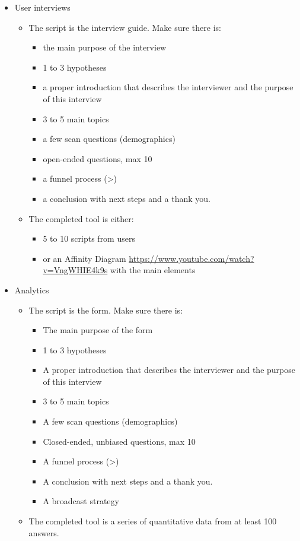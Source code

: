 \begin{itemize}
\item User interviews
\begin{itemize}
\item The script is the interview guide. Make sure there is:
\begin{itemize}
\item the main purpose of the interview
\item 1 to 3 hypotheses
\item a proper introduction that describes the interviewer and the purpose of this interview
\item 3 to 5 main topics
\item a few scan questions (demographics)
\item open-ended questions, max 10
\item a funnel process (>)
\item a conclusion with next steps and a thank you.
\end{itemize}
\item The completed tool is either:
\begin{itemize}
\item 5 to 10 scripts from users
\item or an Affinity Diagram \url{https://www.youtube.com/watch?v=VngWHIE4k9s} with the main elements
\end{itemize}
\end{itemize}
\end{itemize}

\begin{itemize}
\item Analytics
\begin{itemize}
\item The script is the form. Make sure there is:
\begin{itemize}
\item The main purpose of the form
\item 1 to 3 hypotheses
\item A proper introduction that describes the interviewer and the purpose of this interview
\item 3 to 5 main topics
\item A few scan questions (demographics)
\item Closed-ended, unbiased questions, max 10
\item A funnel process (>)
\item A conclusion with next steps and a thank you.
\item A broadcast strategy
\end{itemize}
\item The completed tool is a series of quantitative data from at least 100 answers.
\end{itemize}
\end{itemize}

